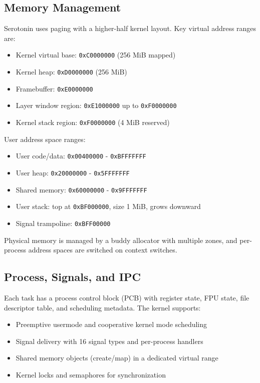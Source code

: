 \documentclass[11pt,a4paper]{article}
\begin{document}
\subsection{Memory Management}
Serotonin uses paging with a higher-half kernel layout. Key virtual address ranges are:
\begin{itemize}
	\item Kernel virtual base: \texttt{0xC0000000} (256 MiB mapped)
	\item Kernel heap: \texttt{0xD0000000} (256 MiB)
	\item Framebuffer: \texttt{0xE0000000}
	\item Layer window region: \texttt{0xE1000000} up to \texttt{0xF0000000}
	\item Kernel stack region: \texttt{0xF0000000} (4 MiB reserved)
\end{itemize}
User address space ranges:
\begin{itemize}
	\item User code/data: \texttt{0x00400000} - \texttt{0xBFFFFFFF}
	\item User heap: \texttt{0x20000000} - \texttt{0x5FFFFFFF}
	\item Shared memory: \texttt{0x60000000} - \texttt{0x9FFFFFFF}
	\item User stack: top at \texttt{0xBF000000}, size 1 MiB, grows downward
	\item Signal trampoline: \texttt{0xBFF00000}
\end{itemize}
Physical memory is managed by a buddy allocator with multiple zones, and per-process address spaces are switched on context switches.

\subsection{Process, Signals, and IPC}
Each task has a process control block (PCB) with register state, FPU state, file descriptor table, and scheduling metadata. The kernel supports:
\begin{itemize}
	\item Preemptive usermode and cooperative kernel mode scheduling
	\item Signal delivery with 16 signal types and per-process handlers
	\item Shared memory objects (create/map) in a dedicated virtual range
	\item Kernel locks and semaphores for synchronization
\end{itemize}
\end{document}
